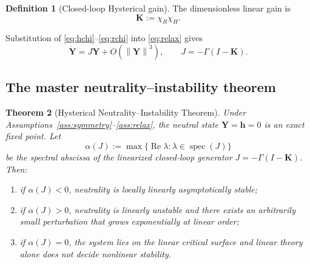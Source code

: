 \documentclass[11pt]{article}
\newtheorem{theorem}{Theorem}[section]
\theoremstyle{definition}
\newtheorem{definition}[theorem]{Definition}
\theoremstyle{remark}
\newcommand{\norm}[1]{\left\lVert #1\right\rVert}
\newcommand{\Y}{\mathbf{Y}}
\newcommand{\h}{\mathbf{h}}
\newcommand{\K}{\mathbf{K}}
\newcommand{\Gm}{\Gamma}
\newcommand{\chiR}{\chi_{R}}
\newcommand{\chiH}{\chi_{H}}
\begin{document}
\begin{definition}[Closed-loop Hysterical gain]
The dimensionless linear gain is
\begin{equation}
 \boxed{\K:=\chiR\chiH.}
 \label{eq:gain}
\end{equation}
\end{definition}

Substitution of \eqref{eq:hchi}--\eqref{eq:rchi} into \eqref{eq:relax} gives
\begin{equation}
 \dot{\Y}=J\Y+O(\norm{\Y}^3),\qquad
 \boxed{J=-\Gm(I-\K).}
 \label{eq:J}
\end{equation}

\subsection{The master neutrality--instability theorem}\label{sec:master}
\begin{theorem}[Hysterical Neutrality--Instability Theorem]\label{thm:master}
Under Assumptions~\ref{ass:symmetry}--\ref{ass:relax}, the neutral state $\Y=\h=0$ is an exact fixed point.  Let
\begin{equation}
 \alpha(J):=\max\{\operatorname{Re}\lambda:\lambda\in\operatorname{spec}(J)\}
\end{equation}
be the spectral abscissa of the linearized closed-loop generator $J=-\Gm(I-\K)$.  Then:
\begin{enumerate}[label=(\roman*)]
 \item if $\alpha(J)<0$, neutrality is locally linearly asymptotically stable;
 \item if $\alpha(J)>0$, neutrality is linearly unstable and there exists an arbitrarily small perturbation that grows exponentially at linear order;
 \item if $\alpha(J)=0$, the system lies on the linear critical surface and linear theory alone does not decide nonlinear stability.
\end{enumerate}
\end{theorem}
\end{document}

